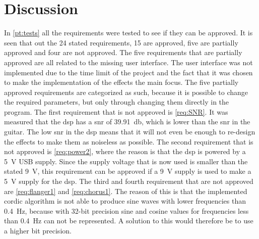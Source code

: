 \section{Discussion}\label{sec:discussion}

In \autoref{pt:tests} all the requirements were tested to see if they can be approved. It is seen that out the 24 stated requirements, 15 are approved, five are partially approved and four are not approved. 
The five requirements that are partially approved are all related to the missing user interface. The user interface was not implemented due to the time limit of the project and the fact that it was chosen to make the implementation of the effects the main focus. The five partially approved requirements are categorized as such, because it is possible to change the required parameters, but only through changing them directly in the program. The first requirement that is not approved is \autoref{req:SNR}. It was measured that the \gls{dsp} has a \gls{snr} of \SI{39.91}{\decibel}, which is lower than the \gls{snr} in the guitar. The low \gls{snr} in the \gls{dsp} means that it will not even be enough to re-design the effects to make them as noiseless as possible.  
The second requirement that is not approved is \autoref{req:power2}, where the reason is that the \gls{dsp} is powered by a \SI{5}{\volt} USB supply. Since the supply voltage that is now used is smaller than the stated \SI{9}{\volt}, this requirement can be approved if a \SI{9}{\volt} supply is used to make a \SI{5}{\volt} supply for the \gls{dsp}.
The third and fourth requirement that are not approved are \autoref{req:flanger1} and \autoref{req:chorus1}. The reason of this is that the implemented \gls{cordic} algorithm is not able to produce sine waves with lower frequencies than \SI{0.4}{\hertz}, because with 32-bit precision sine and cosine values for frequencies less than \SI{0.4}{\hertz} can not be represented. A solution to this would therefore be to use a higher bit precision. \\

